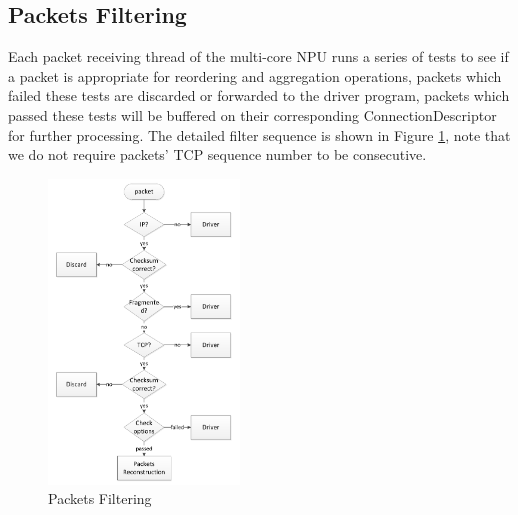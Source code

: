 \documentclass[conference]{IEEEtran}
\begin{document}
\subsection{Packets Filtering}
Each packet receiving thread of the multi-core NPU runs a series of tests to see if a packet is appropriate for reordering and aggregation operations, packets which failed these tests are discarded or forwarded to the driver program, packets which passed these tests will be buffered on their corresponding ConnectionDescriptor for further processing. The detailed filter sequence is shown in Figure \ref{packets filtering}, note that we do not require packets' TCP sequence number to be consecutive.
\begin{figure}[!t]
\centering
\includegraphics[width=2.0in]{filter_packets}
\caption{Packets Filtering}
\label{packets filtering}
\end{figure}
\end{document}
